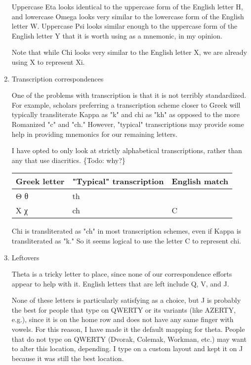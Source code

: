 \documentclass[11pt]{article}
\begin{document}
\begin{enumerate}
Uppercase Eta looks identical to the uppercase form of the English letter H, and lowercase Omega looks very similar to the lowercase form of the English letter W. Uppercase Psi looks similar enough to the uppercase form of the English letter Y that it is worth using as a mnemonic, in my opinion.

Note that while Chi looks very similar to the English letter X, we are already using X to represent Xi.

\item Transcription correspondences
\label{sec:org675cc0b}

One of the problems with transcription is that it is not terribly standardized. For example, scholars preferring a transcription scheme closer to Greek will typically transliterate Kappa as "k" and chi as "kh" as opposed to the more Romanized "c" and "ch." However, "typical" transcriptions may provide some help in providing mnemonics for our remaining letters.

I have opted to only look at strictly alphabetical transcriptions, rather than any that use diacritics. \{Todo: why?\}

\begin{center}
\begin{tabular}{lll}
Greek letter & "Typical" transcription & English match\\
\hline
Θ θ & th & \\
Χ χ & ch & C\\
\end{tabular}
\end{center}

Chi is transliterated as "ch" in most transcription schemes, even if Kappa is transliterated as "k." So it seems logical to use the letter C to represent chi.

\item Leftovers
\label{sec:org470aaf0}

Theta is a tricky letter to place, since none of our correspondence efforts appear to help with it. English letters that are left include Q, V, and J.

None of these letters is particularly satisfying as a choice, but J is probably the best for people that type on QWERTY or its variants (like AZERTY, e.g.), since it is on the home row and does not have any same finger with vowels. For this reason, I have made it the default mapping for theta. People that do not type on QWERTY (Dvorak, Colemak, Workman, etc.) may want to alter this location, depending. I type on a custom layout and kept it on J because it was still the best location.


\end{enumerate}
\end{document}
